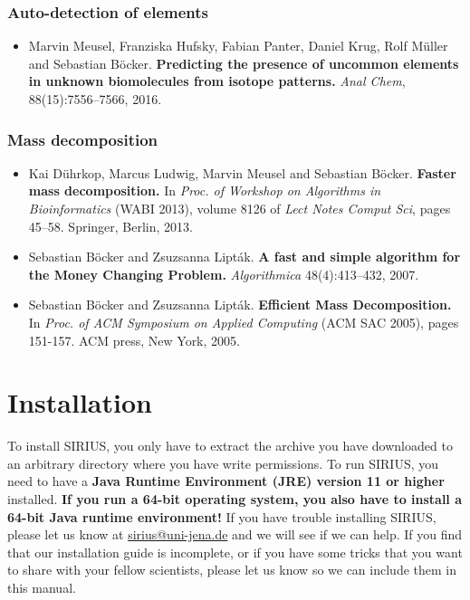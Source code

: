 \documentclass[letterpaper,10pt,openany,oneside]{sphinxmanual}
\begin{document}
\subsection*{Auto-detection of elements}
\label{introduction:auto-detection-of-elements}

\begin{itemize}
\item Marvin Meusel, Franziska Hufsky, Fabian Panter, Daniel Krug, Rolf Müller and Sebastian Böcker.
\textbf{Predicting the presence of uncommon elements in unknown biomolecules from isotope patterns.}
\emph{Anal Chem}, 88(15):7556--7566, 2016. 
\end{itemize}

\subsection*{Mass decomposition}
\label{introduction:mass-decomposition}

\begin{itemize}
\item Kai Dührkop, Marcus Ludwig, Marvin Meusel and Sebastian Böcker.
\textbf{Faster mass decomposition.}
In \emph{Proc. of Workshop on Algorithms in Bioinformatics} (WABI 2013), volume 8126 of \emph{Lect Notes Comput Sci}, pages 45--58. Springer, Berlin, 2013.

\item Sebastian Böcker and Zsuzsanna Lipták.
\textbf{A fast and simple algorithm for the Money Changing Problem.}
\emph{Algorithmica} 48(4):413--432, 2007.

\item Sebastian Böcker and Zsuzsanna Lipták.
\textbf{Efficient Mass Decomposition.}
In \emph{Proc. of ACM Symposium on Applied Computing} (ACM SAC 2005), pages 151-157. ACM press, New York, 2005. 
\end{itemize}



\chapter{Installation}
\label{install:installation}\label{install::doc}\label{install:user-interface}

To install SIRIUS, you only have to extract the archive you have downloaded
to an arbitrary directory where you have write permissions.  To run SIRIUS,
you need to have a \textbf{Java Runtime Environment (JRE) version 11 or
higher} installed.  \textbf{If you run a 64-bit operating system, you also
have to install a 64-bit Java runtime environment!}  If you have trouble
installing SIRIUS, please let us know at \url{sirius@uni-jena.de} and we will
see if we can help.  If you find that our installation guide is incomplete,
or if you have some tricks that you want to share with your fellow
scientists, please let us know so we can include them in this manual.
\end{document}
